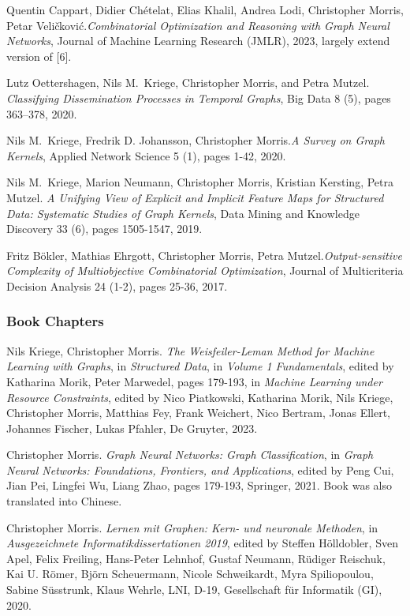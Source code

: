 \documentclass[10pt, a4paper, DIV=14, headings=small]{scrartcl}
\begin{document}
\begin{thebibliography}{15}
	Quentin Cappart, Didier Chételat, Elias Khalil, Andrea Lodi, Christopher Morris, Petar Veli\v{c}kovi\'{c}.\footnotemark[2]
	\emph{Combinatorial Optimization and Reasoning with Graph Neural Networks},
	Journal of Machine Learning Research (JMLR), 2023, largely extend version of [6].

	Lutz Oettershagen, Nils M.~Kriege, Christopher Morris, and Petra Mutzel.
	\emph{Classifying Dissemination Processes in Temporal Graphs},
	Big Data 8 (5), pages 363--378, 2020.

	Nils M.~Kriege,  Fredrik D. Johansson, Christopher Morris.\footnotemark[2]
	\emph{A Survey on Graph Kernels},
	Applied Network Science 5 (1), pages 1-42, 2020.

	Nils M.~Kriege,  Marion Neumann, Christopher Morris, Kristian Kersting, Petra Mutzel.
	\emph{A Unifying View of Explicit and Implicit Feature Maps for Structured Data: Systematic Studies of Graph Kernels},
	Data Mining and Knowledge Discovery 33 (6), pages 1505-1547, 2019.

	Fritz B\"okler, Mathias Ehrgott, Christopher Morris, Petra Mutzel.\footnotemark[1]
	\emph{Output-sensitive Complexity of Multiobjective Combinatorial Optimization},
	Journal of Multicriteria Decision Analysis 24 (1-2), pages 25-36, 2017.

	\subsubsection*{Book Chapters}

	Nils Kriege, Christopher Morris.
	\emph{The Weisfeiler-Leman Method for Machine Learning with Graphs},
	in \emph{Structured Data}, in \emph{Volume 1 Fundamentals}, edited by Katharina Morik, Peter Marwedel, pages 179-193, in \emph{Machine Learning under Resource Constraints},
	edited by Nico Piatkowski, Katharina Morik, Nils Kriege, Christopher Morris, Matthias Fey, Frank Weichert, Nico Bertram, Jonas Ellert, Johannes Fischer, Lukas Pfahler, De Gruyter, 2023.

	Christopher Morris.
	\emph{Graph Neural Networks: Graph Classification},
	in \emph{Graph Neural Networks: Foundations, Frontiers, and Applications}, edited by Peng Cui, Jian Pei, Lingfei Wu, Liang Zhao, pages 179-193, Springer, 2021. Book was also translated into Chinese.

	Christopher Morris.
	\emph{Lernen mit Graphen: Kern- und neuronale Methoden}, in
	\emph{Ausgezeichnete Informatikdissertationen 2019}, edited by Steffen H{\"o}lldobler, Sven Apel, Felix Freiling, Hans-Peter Lehnhof, Gustaf Neumann, R{\"u}diger Reischuk, Kai U. R{\"o}mer, Bj{\"o}rn Scheuermann, Nicole Schweikardt, Myra Spiliopoulou, Sabine S{\"u}sstrunk, Klaus Wehrle, LNI, D-19, Gesellschaft f{\"u}r Informatik (GI), 2020.


\end{thebibliography}
\end{document}

